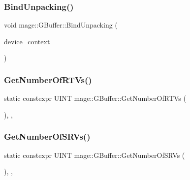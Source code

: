 \hypertarget{structmage_1_1_g_buffer_ae8495251fe7fc2402f8f8bae30c57b94}{}\label{structmage_1_1_g_buffer_ae8495251fe7fc2402f8f8bae30c57b94} 
\subsubsection{\texorpdfstring{Bind\+Unpacking()}{BindUnpacking()}}
{\footnotesize\ttfamily void mage\+::\+G\+Buffer\+::\+Bind\+Unpacking (\begin{DoxyParamCaption}\item[{I\+D3\+D11\+Device\+Context2 $\ast$}]{device\+\_\+context }\end{DoxyParamCaption})\hspace{0.3cm}{\ttfamily [noexcept]}}

\hypertarget{structmage_1_1_g_buffer_a6fc048cc3d9e012f56494a3592a84f3d}{}\label{structmage_1_1_g_buffer_a6fc048cc3d9e012f56494a3592a84f3d} 
\subsubsection{\texorpdfstring{Get\+Number\+Of\+R\+T\+Vs()}{GetNumberOfRTVs()}}
{\footnotesize\ttfamily static constexpr U\+I\+NT mage\+::\+G\+Buffer\+::\+Get\+Number\+Of\+R\+T\+Vs (\begin{DoxyParamCaption}{ }\end{DoxyParamCaption})\hspace{0.3cm}{\ttfamily [static]}, {\ttfamily [private]}, {\ttfamily [noexcept]}}

\hypertarget{structmage_1_1_g_buffer_a07d656b95c8586187ce48e67a8c89dfc}{}\label{structmage_1_1_g_buffer_a07d656b95c8586187ce48e67a8c89dfc} 
\subsubsection{\texorpdfstring{Get\+Number\+Of\+S\+R\+Vs()}{GetNumberOfSRVs()}}
{\footnotesize\ttfamily static constexpr U\+I\+NT mage\+::\+G\+Buffer\+::\+Get\+Number\+Of\+S\+R\+Vs (\begin{DoxyParamCaption}{ }\end{DoxyParamCaption})\hspace{0.3cm}{\ttfamily [static]}, {\ttfamily [private]}, {\ttfamily [noexcept]}}

